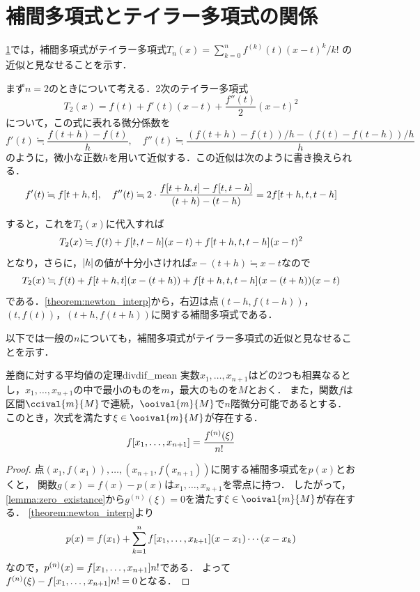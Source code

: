 \documentclass[../../main]{subfiles}
\begin{document}
\section{補間多項式とテイラー多項式の関係}
\label{section:taylor}
\cref{section:taylor}では，補間多項式がテイラー多項式\(T_n(x)=\sum_{k=0}^nf^{(k)}(t)(x-t)^k/k!\)
の近似と見なせることを示す．

まず\(n=2\)のときについて考える．2次のテイラー多項式
\[
  T_2(x) = f(t)+f'(t)(x-t)+\frac{f''(t)}{2}(x-t)^2
\]
について，この式に表れる微分係数を
\[
  f'(t) \fallingdotseq \frac{f(t+h)-f(t)}{h},
  \quad f''(t) \fallingdotseq \frac{(f(t+h)-f(t))/h-(f(t)-f(t-h))/h}{h}
\]
のように，微小な正数\(h\)を用いて近似する．この近似は次のように書き換えられる．
\[
  f'(t) \fallingdotseq \divdiff[f]{t+h,t},
  \quad f''(t) \fallingdotseq 2\cdot\frac{\divdiff[f]{t+h,t}-\divdiff[f]{t,t-h}}{(t+h)-(t-h)}
  = 2\divdiff[f]{t+h,t,t-h}
\]

すると，これを\(T_2(x)\)に代入すれば
\[
  T_2(x)\fallingdotseq f(t)+\divdiff[f]{t,t-h}(x-t)+\divdiff[f]{t+h,t,t-h}(x-t)^2
\]
となり，さらに，\(\abs{h}\)の値が十分小さければ\(x-(t+h)\fallingdotseq x-t\)なので
\[
  T_2(x)\fallingdotseq f(t)+\divdiff[f]{t+h,t}(x-(t+h))+\divdiff[f]{t+h,t,t-h}(x-(t+h))(x-t)
\]
である．\cref{theorem:newton_interp}から，右辺は点\((t-h,f(t-h))\)，\((t,f(t))\)，\((t+h,f(t+h))\)に関する補間多項式である．

以下では一般の\(n\)についても，補間多項式がテイラー多項式の近似と見なせることを示す．

\begin{theorem}{差商に対する平均値の定理}{divdif_mean}
実数\(x_1,\dots,x_{n+1}\)はどの2つも相異なるとし，\(x_1,\dots,x_{n+1}\)の中で最小のものを\(m\)，最大のものを\(M\)とおく．
また，関数\(f\)は区間\(\ccival{m}{M}\)で連続，\(\ooival{m}{M}\)で\(n\)階微分可能であるとする．
このとき，次式を満たす\(\xi\in\ooival{m}{M}\)が存在する．
\[
  \divdiff[f]{x_1,\dots,x_{n+1}} = \frac{f^{(n)}(\xi)}{n!}
\]
\end{theorem}

\begin{proof}
点\((x_1,f(x_1)),\dots,(x_{n+1},f(x_{n+1}))\)に関する補間多項式を\(p(x)\)とおくと，
関数\(g(x)=f(x)-p(x)\)は\(x_1,\dots,x_{n+1}\)を零点に持つ．
したがって，\cref{lemma:zero_existance}から\(g^{(n)}(\xi)=0\)を満たす\(\xi\in\ooival{m}{M}\)が存在する．
\cref{theorem:newton_interp}より
\[
  p(x) = f(x_1)+\sum_{k=1}^{n}\divdiff[f]{x_1,\dots,x_{k+1}}(x-x_1)\dotsm(x-x_k)
\]
なので，\(p^{(n)}(x)=\divdiff[f]{x_1,\dots,x_{n+1}}n!\)である．
よって\(f^{(n)}(\xi)-\divdiff[f]{x_1,\dots,x_{n+1}}n!=0\)となる．
\end{proof}
\end{document}
